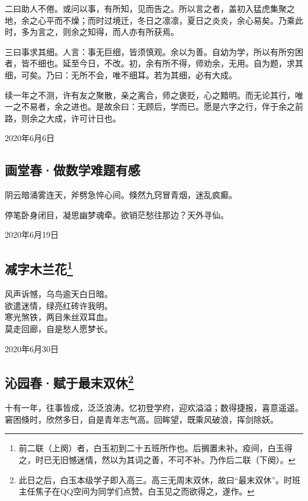 \documentclass[a5paper]{ctexart}
\begin{document}
	二曰助人不倦。或问以事，有所知，见而告之。所以言之者，盖初入猛虎集聚之地，余之心平而不燥；而时过境迁，冬日之凛凛，夏日之炎炎，余心易矣。乃乘此时，多为言之，则余之知得，而人亦有所获焉。
	
	三曰事求其细。人言：事无巨细，皆须慎观。余以为善。自幼为学，所以有所穷困者，皆不细也。延至今日，不改。初，余有所不得，师劝余，无用。自为题，求其细，可矣。乃曰：无所不会，唯不细耳。若为其细，必有大成。
	
	续一年之不测，许有友之聚散，亲之离合，师之褒贬，心之黯明。而无论其行，唯一之不易者，余之进也。是故余曰：无顾后，学而已。愿是六字之行，伴于余之前路，则余之大成，许可计日也。
	\begin{flushright}
			2020年6月6日
	\end{flushright}
	
	
	\subsection{画堂春·做数学难题有感}
	阴云暗涌雾连天，斧劈急悴心间。倏然九窍冒青烟，迷乱疯癫。
	
	停笔卧身闭目，凝思幽梦魂牵。欲销茫愁往那边？天外寻仙。
	\begin{flushright}
		2020年6月19日
	\end{flushright}
	
	\subsection[减字木兰花（风声诉憾）]{减字木兰花\footnote{前二联（上阕）者，白玉初到二十五班所作也。后搁置未补。疫间，白玉得之，时已无旧憾迷情，然以为其词之善，不可不补。乃作后二联（下阕）。}}
	\begin{center}
		风声诉憾，乌鸟逾天白日暗。\\
		欲遣迷情，绿亮红砖许我明。\\
		寒光煞铁，两目朱丝双耳血。\\
		莫走回廊，自是愁人愿梦长。
	\end{center}
	\hfill 2020年6月30日
	
	\subsection[沁园春·赋于最末双休]{沁园春·赋于最末双休\footnote{此日之后，白玉本级学子即入高三。高三无周末双休，故曰“最末双休”。时班主任焦子在QQ空间为同学们点赞。白玉见之而欲得之，遂作。}}
	十有一年，往事皆成，泛泛浪涛。忆初登学府，迎欢溢溢；数得捷报，喜意遥遥。窘困倏时，欣然多日，自是青年志气高。回眸望，既乘风破浪，挥剑除妖。
	
\end{document}
